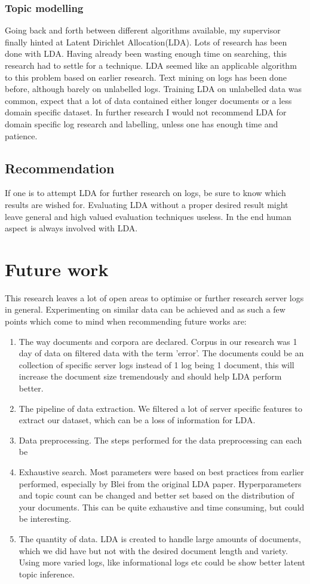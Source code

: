 \subsubsection{Topic modelling}
Going back and forth between different algorithms available, my supervisor finally hinted at Latent Dirichlet Allocation(LDA). Lots of research has been done with LDA. Having already been wasting enough time on searching, this research had to settle for a technique. LDA seemed like an applicable algorithm to this problem based on earlier research. Text mining on logs has been done before, although barely on unlabelled logs. Training LDA on unlabelled data was common, expect that a lot of data contained either longer documents or a less domain specific dataset. In further research I would not recommend LDA for domain specific log research and labelling, unless one has enough time and patience. 

\subsection{Recommendation}
If one is to attempt LDA for further research on logs, be sure to know which results are wished for. Evaluating LDA without a proper desired result might leave general and high valued evaluation techniques useless. In the end human aspect is always involved with LDA.

\section{Future work}
This research leaves a lot of open areas to optimise or further research server logs in general. Experimenting on similar data can be achieved and as such a few points which come to mind when recommending future works are:

\begin{enumerate}
    \item The way documents and corpora are declared. Corpus in our research was 1 day of data on filtered data with the term 'error'. The documents could be an collection of specific server logs instead of 1 log being 1 document, this will increase the document size tremendously and should help LDA perform better.
    \item The pipeline of data extraction. We filtered a lot of server specific features to extract our dataset, which can be a loss of information for LDA. 
    \item Data preprocessing. The steps performed for the data preprocessing can each be 
    \item Exhaustive search. Most parameters were based on best practices from earlier performed, especially by Blei from the original LDA paper. Hyperparameters and topic count can be changed and better set based on the distribution of your documents. This can be quite exhaustive and time consuming, but could be interesting.
    \item The quantity of data. LDA is created to handle large amounts of documents, which we did have but not with the desired document length and variety. Using more varied logs, like informational logs etc could be show better latent topic inference. 
\end{enumerate}
